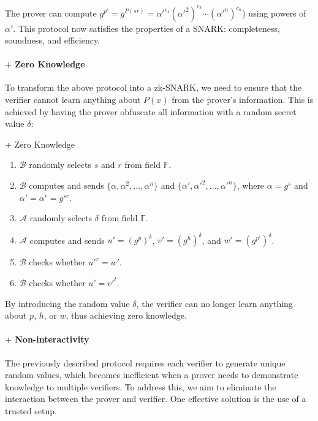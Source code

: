 \documentclass{article}
\begin{document}
The prover can compute $g^{p'} = g^{P(sr)} = \alpha'^{c_1} (\alpha'^{2})^{c_2} \cdots (\alpha'^{n})^{c_n}$) using powers of $\alpha'$. This protocol now satisfies the properties of a SNARK: completeness, soundness, and efficiency.

\paragraph{$+$ Zero Knowledge}

To transform the above protocol into a zk-SNARK, we need to ensure that the verifier cannot learn anything about $P(x)$ from the prover's information. This is achieved by having the prover obfuscate all information with a random secret value $\delta$:

\begin{protocol}{$+$ Zero Knowledge}{}
\begin{enumerate}
    \item $\mathcal{B}$ randomly selects $s$ and $r$ from field $\mathbb{F}$.
    \item $\mathcal{B}$ computes and sends $\{\alpha, \alpha^2, ..., \alpha^{n}\}$ and $\{\alpha', \alpha'^2, ..., \alpha'^{n}\}$, where $\alpha = g^{s}$ and $\alpha' = \alpha^{r} = g^{sr}$.
    \item $\mathcal{A}$ randomly selects $\delta$ from field $\mathbb{F}$.
    \item $\mathcal{A}$ computes and sends $u' = (g^{p})^{\delta}$, $v' = (g^{h})^{\delta}$, and $w' = (g^{p'})^{\delta}$.
    \item $\mathcal{B}$ checks whether $u'^{r} = w'$.
    \item $\mathcal{B}$ checks whether $u' = v'^{t}$.
\end{enumerate}
\end{protocol}

By introducing the random value $\delta$, the verifier can no longer learn anything about $p$, $h$, or $w$, thus achieving zero knowledge.

\paragraph{$+$ Non-interactivity}

The previously described protocol requires each verifier to generate unique random values, which becomes inefficient when a prover needs to demonstrate knowledge to multiple verifiers. To address this, we aim to eliminate the interaction between the prover and verifier. One effective solution is the use of a trusted setup.
\end{document}
